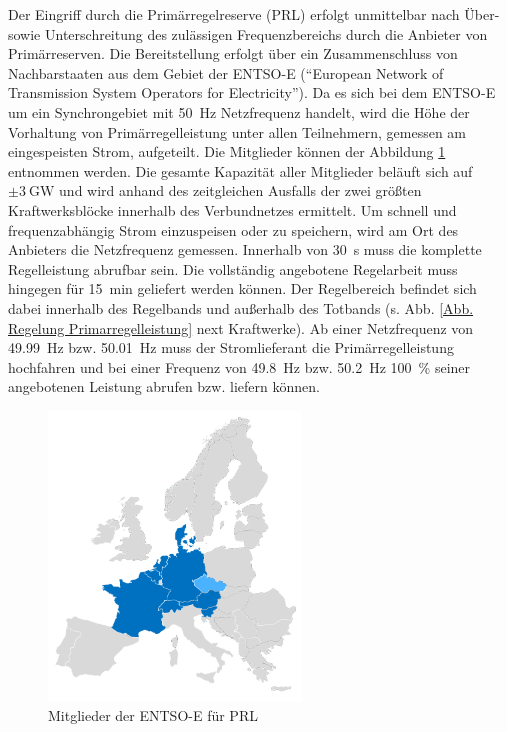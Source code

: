 			Der Eingriff durch die Primärregelreserve (PRL) erfolgt unmittelbar nach Über- sowie Unterschreitung des zulässigen Frequenzbereichs durch die Anbieter von Primärreserven.
			Die Bereitstellung erfolgt über ein Zusammenschluss von Nachbarstaaten aus dem Gebiet der ENTSO-E ("`European Network of Transmission System Operators for Electricity"').
			Da es sich bei dem ENTSO-E um ein Synchrongebiet mit \SI{50}{\hertz} Netzfrequenz handelt, wird die Höhe der Vorhaltung von Primärregelleistung unter allen Teilnehmern, gemessen am eingespeisten Strom, aufgeteilt.
			Die Mitglieder können der Abbildung \ref{Abb. Mitglieder ENTSO-E} entnommen werden.
			Die gesamte Kapazität aller Mitglieder beläuft sich auf $\pm\SI{3}{\giga\watt}$ und wird anhand des zeitgleichen Ausfalls der zwei größten Kraftwerksblöcke innerhalb des Verbundnetzes ermittelt.
			Um schnell und frequenzabhängig Strom einzuspeisen oder zu speichern, wird am Ort des Anbieters die Netzfrequenz gemessen. 
			Innerhalb von \SI{30}{\second} muss die komplette Regelleistung abrufbar sein.
			Die vollständig angebotene Regelarbeit muss hingegen für \SI{15}{\minute} geliefert werden können.
			Der Regelbereich befindet sich dabei innerhalb des Regelbands und außerhalb des Totbands (s. Abb. \ref{Abb. Regelung Primarregelleistung} next Kraftwerke).
			Ab einer Netzfrequenz von \SI{49,99}{\hertz} bzw. \SI{50,01}{\hertz} muss der Stromlieferant die Primärregelleistung hochfahren und bei einer Frequenz von \SI{49,8}{\hertz} bzw. \SI{50,2}{\hertz} \SI{100}{\percent} seiner angebotenen Leistung abrufen bzw. liefern können. 
			
			\begin{figure}[H]
				\centering
				\includegraphics[page=1,trim=70 70 70 120, clip, width=0.6\textwidth]{./anhang/frc-map.png}
				\caption{Mitglieder der ENTSO-E für PRL\parencite{ENTSO-E_PRL}}
				\label{Abb. Mitglieder ENTSO-E}
			\end{figure}
			
